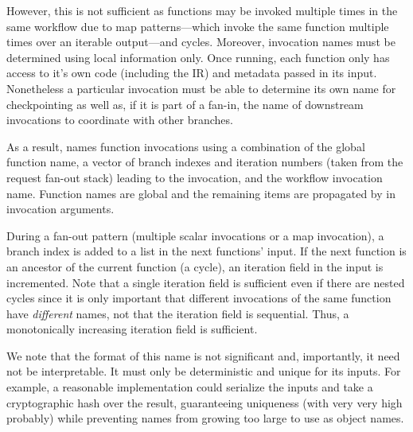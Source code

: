 However, this is not sufficient as functions may be invoked multiple times in
the same workflow due to map patterns---which invoke the same function
multiple times over an iterable output---and cycles. Moreover, invocation
names must be determined using local information only. Once running, each
function only has access to it's own code (including the IR) and metadata
passed in its input. Nonetheless a particular invocation must be able to
determine its own name for checkpointing as well as, if it is part of a
fan-in, the name of downstream invocations to coordinate with other branches.

As a result, \name{} names function invocations using a combination of the
global function name, a vector of branch indexes and iteration numbers (taken
from the \name{} request fan-out stack) leading to the invocation, and the
workflow invocation name. Function names are global and the remaining items
are propagated by \name{} in invocation arguments.

During a fan-out pattern (multiple scalar invocations or a map invocation), a
branch index is added to a list in the next functions' input. If the next
function is an ancestor of the current function (a cycle), an iteration field
in the input is incremented. Note that a single iteration field is sufficient
even if there are nested cycles since it is only important that different
invocations of the same function have \emph{different} names, not that the
iteration field is sequential. Thus, a monotonically increasing iteration
field is sufficient.

We note that the format of this name is not significant and, importantly, it
need not be interpretable. It must only be deterministic and unique for its
inputs. For example, a reasonable implementation could serialize the inputs
and take a cryptographic hash over the result, guaranteeing uniqueness (with
very very high probably) while preventing names from growing too large to use
as object names.
